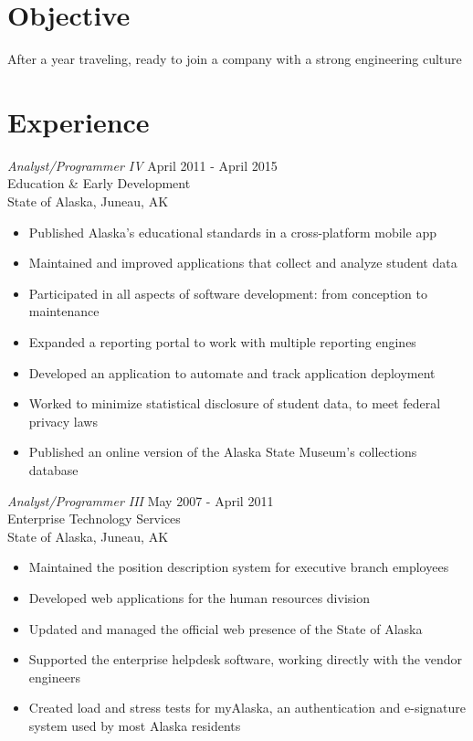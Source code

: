 \documentclass[line,margin]{res}
\begin{document}
\address{\href{mailto:amiller@alumni.uidaho.edu}{amiller@alumni.uidaho.edu}\\ (253) 336-6451}
\address{PO Box 7130\\ New York, NY 10116}
 
\begin{resume}
 
\section{Objective}       After a year traveling, ready to join a company with a strong engineering culture
\section{Experience} {\sl Analyst/Programmer IV} \hfill April 2011 - April 2015 \\
		Education \& Early Development \\
                State of Alaska, Juneau, AK
                \begin{itemize}  \itemsep -2pt %
        \item Published Alaska's educational standards in a cross-platform mobile app
        \item Maintained and improved applications that collect and analyze student data
		\item Participated in all aspects of software development: from conception to maintenance
		\item Expanded a reporting portal to work with multiple reporting engines
		\item Developed an application to automate and track application deployment 
		\item Worked to minimize statistical disclosure of student data, to meet federal privacy laws
		\item Published an online version of the Alaska State Museum's collections database
                \end{itemize}

		{\sl Analyst/Programmer III} \hfill May 2007 - April 2011 \\
                Enterprise Technology Services \\
                State of Alaska, Juneau, AK
                \begin{itemize}  \itemsep -2pt %
        \item Maintained the position description system for executive branch employees
        \item Developed web applications for the human resources division
		\item Updated and managed the official web presence of the State of Alaska
		\item Supported the enterprise helpdesk software, working directly with the vendor engineers
		\item Created load and stress tests for myAlaska, an authentication and e-signature system used by most Alaska residents
                \end{itemize}
 

\end{resume}
\end{document}
